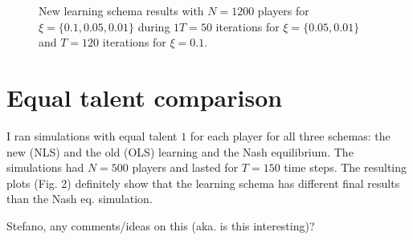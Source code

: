 \documentclass{article}
\begin{document}
\begin{figure}[!htb]
\bigskip

\caption{New learning schema results with $N = 1200$ players for $\xi = \{0.1, 0.05, 0.01\}$ during $1T = 50$ iterations for $\xi = \{0.05, 0.01\}$ and $T = 120$ iterations for $\xi = 0.1$.}
\end{figure}

\break

\section{Equal talent comparison}
I ran simulations with equal talent $1$ for each player for all three schemas: the new (NLS) and the old (OLS) learning and the Nash equilibrium. The simulations had $N=500$ players and lasted for $T=150$ time steps. The resulting plots (Fig. 2) definitely show that the learning schema has different final results than the Nash eq. simulation. \begin{bf} Stefano, any comments/ideas on this (aka. is this interesting)? \end{bf} 
\end{document}
